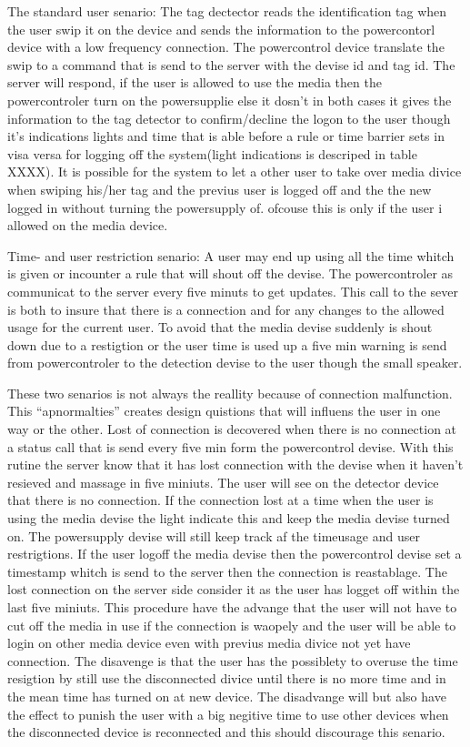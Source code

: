 The standard user senario:
The tag dectector reads the identification tag when the user swip it on the device and sends the information to the powercontorl device with a low frequency connection.
The powercontrol device translate the swip to a command that is send to the server with the devise id and tag id. The server will respond, if the user is allowed to use the media then the powercontroler turn on the powersupplie else it dosn't in both cases it gives the information to the tag detector to confirm/decline the logon to the user though it's indications lights and time that is able before a rule or time barrier sets in visa versa for logging off the system(light indications is descriped in table XXXX). It is possible for the system to let a other user to take over media divice when swiping his/her tag and the previus user is logged off and the the new logged in without turning the powersupply of. ofcouse this is only if the user i allowed on the media device. 

Time- and user restriction senario:
A user may end up using all the time whitch is given or incounter a rule that will shout off the devise. The powercontroler as communicat to the server every five minuts to get updates. This call to the sever is both to insure that there is a connection and for any changes to the allowed usage for the current user. To avoid that the media devise suddenly is shout down due to a restigtion or the user time is used up a five min warning is send from powercontroler to the detection devise to the user though the small speaker. 

These two senarios is not always the reallity because of connection malfunction. 
This "`apnormalties"' creates design quistions that will influens the user in one way or the other.   
Lost of connection is decovered when there is no connection at a status call that is send every five min form the powercontrol devise. With this rutine the server know that it has lost connection with the devise when it haven't resieved and massage in five miniuts. The user will see on the detector device that there is no connection. If the connection lost at a time when the user is using the media devise the light indicate this and keep the media devise turned on. The powersupply devise will still keep track af the timeusage and user restrigtions. If the user logoff the media devise then the powercontrol devise set a timestamp whitch is send to the server then the connection is reastablage. The lost connection on the server side consider it as the user has logget off within the last five miniuts. This procedure have the advange that the user will not have to cut off the media in use if the connection is waopely and the user will be able to login on other media device even with previus media divice not yet have connection. The disavenge is that the user has the possiblety to overuse the time resigtion by still use the disconnected divice until there is no more time and in the mean time has turned on at new device. The disadvange will but also have the effect to punish the user with a big negitive time to use other devices when the disconnected device is reconnected and this should discourage this senario. 

